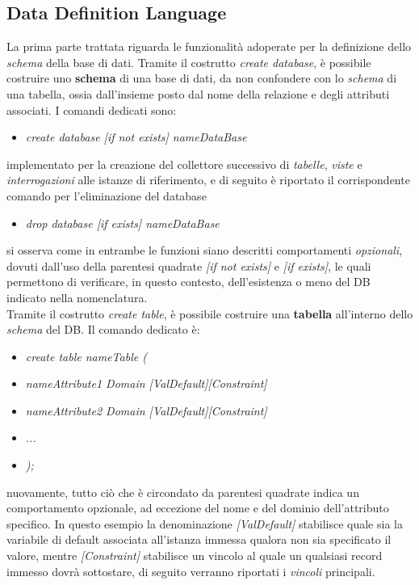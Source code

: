 \documentclass{article}
\begin{document}
\subsection*{Data Definition Language}
\large
La prima parte trattata riguarda le funzionalità adoperate per la definizione dello \textit{schema} della base di dati. Tramite il costrutto \textit{create database}, è possibile costruire uno \textbf{schema} di una base di dati, da non confondere con lo \textit{schema} di una tabella, ossia dall'insieme posto dal nome della relazione e degli attributi associati. I comandi dedicati sono:\vspace*{7pt}
\begin{itemize}[label={ }, leftmargin=1cm]
    \item \textit{create database [if not exists] nameDataBase}
\end{itemize}
implementato per la creazione del collettore successivo di \textit{tabelle}, \textit{viste} e \textit{interrogazioni} alle istanze di riferimento, e di seguito è riportato il corrispondente comando per l'eliminazione del database 
\begin{itemize}[label={ }, leftmargin=1cm]
    \item \textit{drop database [if exists] nameDataBase}
\end{itemize}
si osserva come in entrambe le funzioni siano descritti comportamenti \textit{opzionali}, dovuti dall'uso della parentesi quadrate \textit{[if not exists]} e \textit{[if exists]}, le quali permettono di verificare, in questo contesto, dell'esistenza o meno del DB indicato nella nomenclatura.\vspace*{14pt}\\
Tramite il costrutto \textit{create table}, è possibile costruire una \textbf{tabella} all'interno dello \textit{schema} del DB. Il comando dedicato è:
\begin{itemize}[label={ }, leftmargin=1cm]
    \item \textit{create table nameTable (}
\end{itemize}
\begin{itemize}[label={ }, leftmargin=2cm]
    \itemsep0em
    \item \textit{nameAttribute1 Domain [ValDefault][Constraint]} 
    \item \textit{nameAttribute2 Domain [ValDefault][Constraint]}
    \item \textit{...} 
\end{itemize}
\begin{itemize}[label={ }, leftmargin=1cm] 
    \item \textit{);}
\end{itemize}
nuovamente, tutto ciò che è circondato da parentesi quadrate indica un comportamento opzionale, ad eccezione del nome e del dominio dell'attributo specifico. In questo esempio la denominazione \textit{[ValDefault]} stabilisce quale sia la variabile di default associata all'istanza immessa qualora non sia specificato il valore, mentre \textit{[Constraint]} stabilisce un vincolo al quale un qualsiasi record immesso dovrà sottostare, di seguito verranno riportati i \textit{vincoli} principali.
\end{document}
